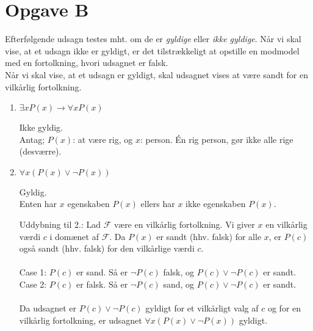 \section*{Opgave B}

Efterfølgende udsagn testes mht. om de er \textit{gyldige} eller \textit{ikke gyldige}. Når vi skal vise, at et udsagn ikke er gyldigt, er det tilstrækkeligt at opstille en modmodel med en fortolkning, hvori udsagnet er falsk.\\ Når vi skal vise, at et udsagn er gyldigt, skal udsagnet vises at være sandt for en vilkårlig fortolkning.

\begin{enumerate}
    \item $\exists x P(x) \rightarrow \forall x P(x)$
    
    \begin{flushright}
        Ikke gyldig. \\ 
        Antag; $P(x)$: at være rig, og $x$: person. Én rig person, gør ikke alle rige (desværre).
    \end{flushright}
    
    
    \item $\forall x (P(x) \vee \neg P(x))$
    
    \begin{flushright}
        Gyldig. \\ 
        Enten har $x$ egenskaben $P(x)$ ellers har $x$ ikke egenskaben $P(x)$.
    \end{flushright}

Uddybning til 2.: Lad $\mathcal{F}$ være en vilkårlig fortolkning. Vi giver $x$ en vilkårlig værdi $c$ i domænet af $\mathcal{F}$. Da $P(x)$ er sandt (hhv. falsk) for alle $x$, er $P(c)$ også sandt (hhv. falsk) for den vilkårlige værdi $c$.\\
\\
Case 1: $P(c)$ er sand. Så er $\neg P(c)$ falsk, og $P(c) \vee \neg P(c)$ er sandt. \\
Case 2: $P(c)$ er falsk. Så er $\neg P(c)$ sand, og $P(c) \vee \neg P(c)$ er sandt.\\
\\
Da udsagnet er $P(c) \vee \neg P(c)$ gyldigt for et vilkårligt valg af $c$ og for en vilkårlig fortolkning, er udsagnet $\forall x (P(x) \vee \neg P(x))$ gyldigt.

\end{enumerate}